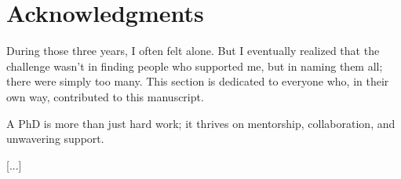 \chapter*{Acknowledgments}
%

During those three years, I often felt alone.
But I eventually realized that the challenge wasn't in finding people who supported me, but in naming them all; there were simply too many.
This section is dedicated to everyone who, in their own way, contributed to this manuscript.

A PhD is more than just hard work; it thrives on mentorship, collaboration, and unwavering support.

[...]